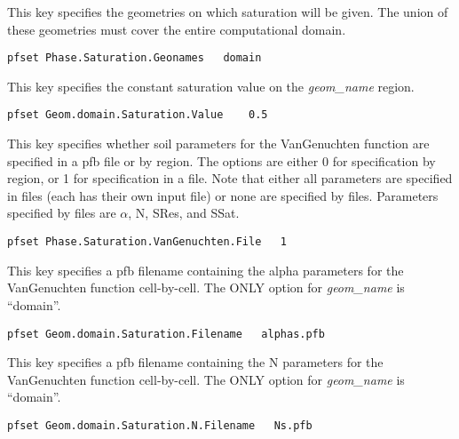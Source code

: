 {This key specifies the geometries on which saturation will be given.
The union of these geometries must cover the entire computational domain.}
\begin{display}\begin{verbatim}
pfset Phase.Saturation.Geonames   domain
\end{verbatim}\end{display}

{This key specifies the constant saturation value on the {\em geom\_name}
region. }
\begin{display}\begin{verbatim}
pfset Geom.domain.Saturation.Value    0.5
\end{verbatim}\end{display}

{This key specifies whether soil parameters for the VanGenuchten function are
specified in a pfb file or by region.  The options are either 0 for
specification by region, or 1 for specification in a file.  Note that either
all parameters are specified in files (each has their own input file) or none
are specified by files.  Parameters specified by files are $\alpha$, N, SRes,
and SSat.}
\begin{display}\begin{verbatim}
pfset Phase.Saturation.VanGenuchten.File   1
\end{verbatim}\end{display}

{This key specifies a pfb filename containing the alpha parameters for the
VanGenuchten function cell-by-cell.  The ONLY option for {\em geom\_name} is
``domain''.}
\begin{display}\begin{verbatim}
pfset Geom.domain.Saturation.Filename   alphas.pfb
\end{verbatim}\end{display}

{This key specifies a pfb filename containing the N parameters for the
VanGenuchten function cell-by-cell.  The ONLY option for {\em geom\_name} is
``domain''.}
\begin{display}\begin{verbatim}
pfset Geom.domain.Saturation.N.Filename   Ns.pfb
\end{verbatim}\end{display}

